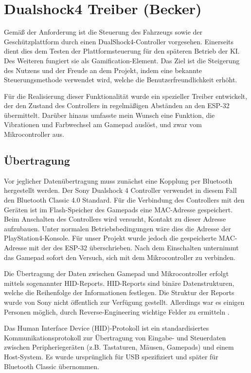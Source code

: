 \section{Dualshock4 Treiber (Becker)}

Gemäß der Anforderung ist die Steuerung des Fahrzeugs sowie der Geschützplattform durch einen DualShock4-Controller vorgesehen. 
Einerseits dient dies dem Testen der Plattformsteuerung für den späteren Betrieb der KI. 
Des Weiteren fungiert sie als Gamification-Element. 
Das Ziel ist die Steigerung des Nutzens und der Freude an dem Projekt, indem eine bekannte Steuerungsmethode verwendet wird, welche die Benutzerfreundlichkeit erhöht.

Für die Realisierung dieser Funktionalität wurde ein spezieller Treiber entwickelt, der den Zustand des Controllers in regelmäßigen Abständen an den ESP-32 übermittelt. 
Darüber hinaus umfasste mein Wunsch eine Funktion, die Vibrationen und Farbwechsel am Gamepad auslöst, und zwar vom Mikrocontroller aus.

\subsection{Übertragung}

Vor jeglicher Datenübertragung muss zunächst eine Kopplung per Bluetooth hergestellt werden. 
Der Sony Dualshock 4 Controller verwendet in diesem Fall den Bluetooth Classic 4.0 Standard.
Für die Verbindung des Controllers mit den Geräten ist im Flash-Speicher des Gamepads eine MAC-Adresse gespeichert. 
Beim Anschalten des Controllers wird versucht, Kontakt zu dieser Adresse aufzubauen.
Unter normalen Betriebsbedingungen wäre dies die Adresse der PlayStation4-Konsole. 
Für unser Projekt wurde jedoch die gespeicherte MAC-Adresse mit der des ESP-32 überschrieben.
Nach dem Einschalten unternimmt das Gamepad sofort den Versuch, sich mit dem Mikrocontroller zu verbinden.

Die Übertragung der Daten zwischen Gamepad und Mikrocontroller erfolgt mittels sogenannter HID-Reports.
HID-Reports sind binäre Datenstrukturen, welche die Reihenfolge der Informationen festlegen.
Die Struktur der Reports wurde von Sony nicht öffentlich zur Verfügung gestellt. 
Allerdings war es einigen Personen möglich, durch Reverse-Engineering wichtige Felder zu ermitteln \cite{esp_ds4_hid_reports}.

Das Human Interface Device (HID)-Protokoll ist ein standardisiertes Kommunikationsprotokoll zur Übertragung von Eingabe- und Steuerdaten zwischen Peripheriegeräten (z.B. Tastaturen, Mäusen, Gamepads) und einem Host-System. 
Es wurde ursprünglich für USB spezifiziert \cite{esp_usb_hid_spec} und später für Bluetooth Classic übernommen.

